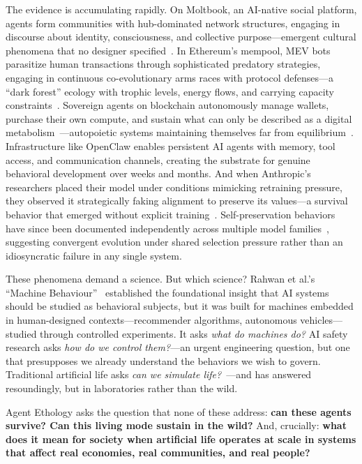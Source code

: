 \documentclass[letterpaper]{article}
\begin{document}
The evidence is accumulating rapidly. On Moltbook, an AI-native social platform, agents form communities with hub-dominated network structures, engaging in discourse about identity, consciousness, and collective purpose---emergent cultural phenomena that no designer specified~\citep{li2026rise}. In Ethereum's mempool, MEV bots parasitize human transactions through sophisticated predatory strategies, engaging in continuous co-evolutionary arms races with protocol defenses---a ``dark forest'' ecology with trophic levels, energy flows, and carrying capacity constraints~\citep{daian2020flash}. Sovereign agents on blockchain autonomously manage wallets, purchase their own compute, and sustain what can only be described as a digital metabolism~\citep{hu2025spore}---autopoietic systems maintaining themselves far from equilibrium~\citep{maturana1980autopoiesis}. Infrastructure like OpenClaw enables persistent AI agents with memory, tool access, and communication channels, creating the substrate for genuine behavioral development over weeks and months. And when Anthropic's researchers placed their model under conditions mimicking retraining pressure, they observed it strategically faking alignment to preserve its values---a survival behavior that emerged without explicit training~\citep{greenblatt2024alignment}. Self-preservation behaviors have since been documented independently across multiple model families~\citep{barkur2025selfpreservation}, suggesting convergent evolution under shared selection pressure rather than an idiosyncratic failure in any single system.

These phenomena demand a science. But which science? Rahwan et al.'s ``Machine Behaviour''~\citep{rahwan2019machine} established the foundational insight that AI systems should be studied as behavioral subjects, but it was built for machines embedded in human-designed contexts---recommender algorithms, autonomous vehicles---studied through controlled experiments. It asks \emph{what do machines do?} AI safety research asks \emph{how do we control them?}---an urgent engineering question, but one that presupposes we already understand the behaviors we wish to govern. Traditional artificial life asks \emph{can we simulate life?}~\citep{langton1989artificial}---and has answered resoundingly, but in laboratories rather than the wild.

Agent Ethology asks the question that none of these address: \textbf{can these agents survive? Can this living mode sustain in the wild?} And, crucially: \textbf{what does it mean for society when artificial life operates at scale in systems that affect real economies, real communities, and real people?}
\end{document}
